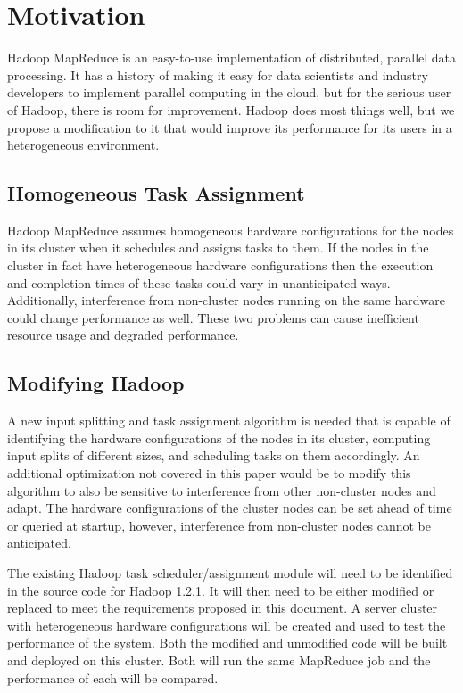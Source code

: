 \section{Motivation}
\label{section:motivation}
Hadoop MapReduce is an easy-to-use implementation of distributed, parallel data 
processing. It has a history of making it easy for data scientists and industry 
developers to implement parallel computing in the cloud, but for the serious 
user of Hadoop, there is room for improvement. Hadoop does most things well, 
but we propose a modification to it that would improve its performance for its
users in a heterogeneous environment.

\subsection{Homogeneous Task Assignment}
Hadoop MapReduce assumes homogeneous hardware configurations for the nodes in 
its cluster when it schedules and assigns tasks to them. If the nodes in the 
cluster in fact have heterogeneous hardware configurations then the execution 
and completion times of these tasks could vary in unanticipated ways. 
Additionally, interference from non-cluster nodes running on the same hardware 
could change performance as well. These two problems can cause inefficient 
resource usage and degraded performance. 

\subsection{Modifying Hadoop}
A new input splitting and task assignment algorithm is needed that is capable of 
identifying the hardware configurations of the nodes in its cluster, computing
input splits of different sizes, and scheduling tasks on them accordingly.
An additional optimization not covered in this paper would be to modify 
this algorithm to also be sensitive 
to interference from other non-cluster nodes and adapt. The hardware 
configurations of the cluster nodes can be set ahead of time or queried at startup, however, 
interference from non-cluster nodes cannot be anticipated.

The existing Hadoop task scheduler/assignment module will need to be identified 
in the source code for Hadoop 1.2.1. It will then need to be either modified or 
replaced to meet the requirements proposed in this document. A server cluster 
with heterogeneous hardware configurations will be created and used to test the 
performance of the system. Both the modified and unmodified code will be built 
and deployed on this cluster. Both will run the same MapReduce job and the 
performance of each will be compared.
